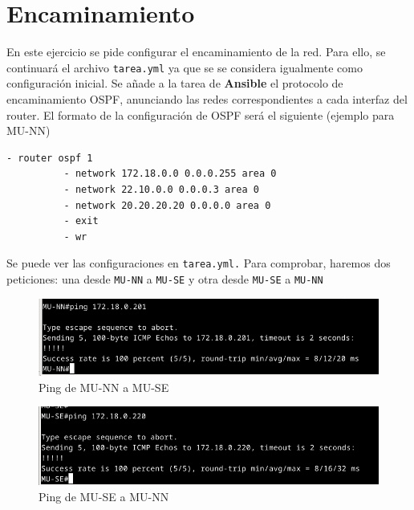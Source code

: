 \documentclass[11pt]{article}
\begin{document}
\section{Encaminamiento}

En este ejercicio se pide configurar el encaminamiento de la red. Para ello, se continuará el archivo \texttt{tarea.yml} ya que se se considera igualmente como configuración inicial. Se añade a la tarea de \textbf{Ansible} el protocolo de encaminamiento OSPF, anunciando las redes correspondientes a cada interfaz del router. El formato de la configuración de OSPF será el siguiente (ejemplo para MU-NN)

\begin{tcolorbox}[
    boxrule=0pt,
    title=Configuración de OSPF en MU-NN, 
]
    \begin{lstlisting}[gobble=6]
          - router ospf 1
          - network 172.18.0.0 0.0.0.255 area 0
          - network 22.10.0.0 0.0.0.3 area 0
          - network 20.20.20.20 0.0.0.0 area 0
          - exit
          - wr
    \end{lstlisting}
\end{tcolorbox}

Se puede ver las configuraciones en \texttt{tarea.yml.} Para comprobar, haremos dos peticiones: una desde \texttt{MU-NN} a \texttt{MU-SE} y otra desde \texttt{MU-SE} a \texttt{MU-NN} 

\begin{figure}[h]
    \centering
    \includegraphics[width=\textwidth]{src/ping1.png}
    \caption{Ping de MU-NN a MU-SE }
\end{figure}


\begin{figure}[h]
    \centering
    \includegraphics[width=\textwidth]{src/ping2.png}
    \caption{Ping de MU-SE a MU-NN }
\end{figure}
\end{document}
